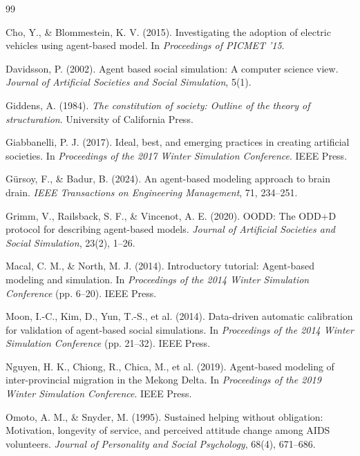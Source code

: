 \documentclass[12pt,a4paper]{article}
\begin{document}
\begin{thebibliography}{99}
\item Cho, Y., \& Blommestein, K. V. (2015). Investigating the adoption of electric vehicles using agent-based model. In \textit{Proceedings of PICMET '15}.

\item Davidsson, P. (2002). Agent based social simulation: A computer science view. \textit{Journal of Artificial Societies and Social Simulation}, 5(1).

\item Giddens, A. (1984). \textit{The constitution of society: Outline of the theory of structuration}. University of California Press.

\item Giabbanelli, P. J. (2017). Ideal, best, and emerging practices in creating artificial societies. In \textit{Proceedings of the 2017 Winter Simulation Conference}. IEEE Press.

\item G\"ursoy, F., \& Badur, B. (2024). An agent-based modeling approach to brain drain. \textit{IEEE Transactions on Engineering Management}, 71, 234--251.

\item Grimm, V., Railsback, S. F., \& Vincenot, A. E. (2020). OODD: The ODD+D protocol for describing agent-based models. \textit{Journal of Artificial Societies and Social Simulation}, 23(2), 1--26.

\item Macal, C. M., \& North, M. J. (2014). Introductory tutorial: Agent-based modeling and simulation. In \textit{Proceedings of the 2014 Winter Simulation Conference} (pp. 6--20). IEEE Press.

\item Moon, I.-C., Kim, D., Yun, T.-S., et al. (2014). Data-driven automatic calibration for validation of agent-based social simulations. In \textit{Proceedings of the 2014 Winter Simulation Conference} (pp. 21--32). IEEE Press.

\item Nguyen, H. K., Chiong, R., Chica, M., et al. (2019). Agent-based modeling of inter-provincial migration in the Mekong Delta. In \textit{Proceedings of the 2019 Winter Simulation Conference}. IEEE Press.

\item Omoto, A. M., \& Snyder, M. (1995). Sustained helping without obligation: Motivation, longevity of service, and perceived attitude change among AIDS volunteers. \textit{Journal of Personality and Social Psychology}, 68(4), 671--686.


\end{thebibliography}
\end{document}
